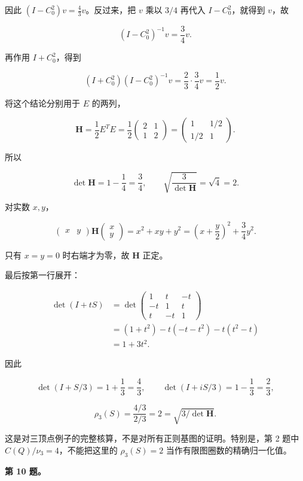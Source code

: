\documentclass[11pt,a4paper]{article}
\begin{document}
因此 \((I-C_0^2)v=\frac43v\)。反过来，把 \(v\) 乘以 \(3/4\) 再代入 \(I-C_0^2\)，就得到 \(v\)，故

\[(I-C_0^2)^{-1}v=\frac34v.\]

再作用 \(I+C_0^2\)，得到

\[(I+C_0^2)(I-C_0^2)^{-1}v
=\frac23\cdot\frac34v=\frac12v.\]

将这个结论分别用于 \(E\) 的两列，

\[\mathbf H=\frac12E^TE
=\frac12\begin{pmatrix}2&1\\1&2\end{pmatrix}
=\begin{pmatrix}1&1/2\\1/2&1\end{pmatrix}.\]

所以

\[\det\mathbf H=1-\frac14=\frac34,\qquad
\sqrt{\frac3{\det\mathbf H}}=\sqrt4=2.\]

对实数 \(x,y\)，

\[\begin{pmatrix}x&y\end{pmatrix}
\mathbf H\begin{pmatrix}x\\y\end{pmatrix}
=x^2+xy+y^2
=\left(x+\frac y2\right)^2+\frac34y^2.\]

只有 \(x=y=0\) 时右端才为零，故 \(\mathbf H\) 正定。

最后按第一行展开：

\[\begin{aligned}
\det(I+tS)
&=\det\begin{pmatrix}1&t&-t\\-t&1&t\\t&-t&1\end{pmatrix}\\
&=(1+t^2)-t(-t-t^2)-t(t^2-t)\\
&=1+3t^2.
\end{aligned}\]

因此

\[\det(I+S/3)=1+\frac13=\frac43,\qquad
\det(I+iS/3)=1-\frac13=\frac23,\]

\[\rho_3(S)=\frac{4/3}{2/3}=2
=\sqrt{3/\det\mathbf H}.\]

这是对三顶点例子的完整核算，不是对所有正则基图的证明。特别是，第 2 题中 \(C(Q)/\nu_3=4\)，不能把这里的 \(\rho_3(S)=2\) 当作有限图圈数的精确归一化值。

\textbf{第 10 题。}
\end{document}
